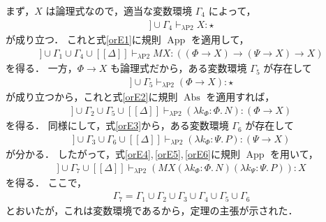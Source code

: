 \documentclass[./main]{subfiles}
\newcommand{\lam}{\lambda}
\newcommand{\bto}{\mathbin{\to}}
\newcommand{\ocl}{\mathord{:}}
\newcommand{\op}[1]{\mathop{\mathrm{#1}}\nolimits}
\newcommand{\typstar}{\mathord{\star}}
\newcommand{\mathscr}[1]{\mathcal{#1}}
\newcommand{\ats}{\,}
\newcommand{\llbracket}{[\![}
\newcommand{\rrbracket}{]\!]}
\theoremstyle{definition}
\begin{document}
まず，$ X $ は論理式なので，適当な変数環境 $ \varGamma _4 $ によって，
\begin{gather*}
\llbracket \mathscr{S} \rrbracket \cup \varGamma _4 \vdash _{\lam \mathrm{P2}} X \ocl\, \typstar
\end{gather*}
が成り立つ．
これと式\ref{orE1}に規則 $ \op{App} $ を適用して，
\begin{gather}
\llbracket \mathscr{S} \rrbracket \cup \varGamma _1 \cup \varGamma _4 \cup \llbracket \varDelta \rrbracket \vdash _{\lam \mathrm{P2}} MX \ocl\, ((\varPhi \bto X) \bto (\varPsi \bto X) \bto X) \label{orE4}
\end{gather}
を得る．
一方，$ \varPhi \bto X $ も論理式だから，ある変数環境 $ \varGamma _5 $ が存在して
\begin{gather*}
\llbracket \mathscr{S} \rrbracket \cup \varGamma _5 \vdash _{\lam \mathrm{P2}} (\varPhi \bto X) \ocl\, \typstar
\end{gather*}
が成り立つから，これと式\ref{orE2}に規則 $ \op{Abs} $ を適用すれば，
\begin{gather}
\llbracket \mathscr{S} \rrbracket \cup \varGamma _2 \cup \varGamma _5 \cup \llbracket \varDelta \rrbracket \vdash _{\lam \mathrm{P2}} (\lam k _\varPhi \ocl\, \varPhi.\, N) \ocl\, (\varPhi \bto X) \label{orE5}
\end{gather}
を得る．
同様にして，式\ref{orE3}から，ある変数環境 $ \varGamma _6 $ が存在して
\begin{gather}
\llbracket \mathscr{S} \rrbracket \cup \varGamma _3 \cup \varGamma _6 \cup \llbracket \varDelta \rrbracket \vdash _{\lam \mathrm{P2}} (\lam k _\varPhi \ocl\, \varPsi.\, P) \ocl\, (\varPsi \bto X) \label{orE6}
\end{gather}
が分かる．
したがって，式\ref{orE4},\ats\ref{orE5},\ats\ref{orE6}に規則 $ \op{App} $ を用いて，
\begin{gather*}
\llbracket \mathscr{S} \rrbracket \cup \varGamma _7 \cup \llbracket \varDelta \rrbracket \vdash _{\lam \mathrm{P2}} (MX (\lam k _\varPhi \ocl\, \varPhi.\, N) (\lam k _\varPsi \ocl\, \varPsi.\, P)) \ocl\, X
\end{gather*}
を得る．
ここで，
\begin{gather*}
\varGamma _7 = \varGamma _1 \cup \varGamma _2 \cup \varGamma _3 \cup \varGamma _4 \cup \varGamma _5 \cup \varGamma _6
\end{gather*}
とおいたが，これは変数環境であるから，定理の主張が示された．

\end{document}
